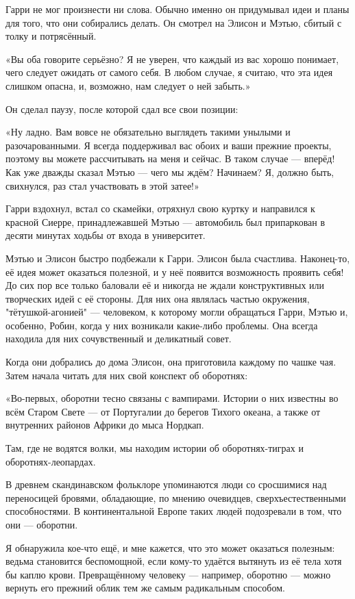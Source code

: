 \documentclass[a4paper,12pt]{book}
\begin{document}
Гарри не мог произнести ни слова. Обычно именно он придумывал идеи и планы для того, что они собирались делать. Он смотрел на Элисон и Мэтью, сбитый с толку и потрясённый.
\par
«Вы оба говорите серьёзно? Я не уверен, что каждый из вас хорошо понимает, чего следует ожидать от самого себя. В любом случае, я считаю, что эта идея слишком опасна, и, возможно, нам следует о ней забыть.»
\par
Он сделал паузу, после которой сдал все свои позиции:
\par
«Ну ладно. Вам вовсе не обязательно выглядеть такими унылыми и разочарованными. Я всегда поддерживал вас обоих и ваши прежние проекты, поэтому вы можете рассчитывать на меня и сейчас. В таком случае — вперёд! Как уже дважды сказал Мэтью — чего мы ждём? Начинаем? Я, должно быть, свихнулся, раз стал участвовать в этой затее!»
\par
Гарри вздохнул, встал со скамейки, отряхнул свою куртку и направился к красной Сиерре, принадлежавшей Мэтью — автомобиль был припаркован в десяти минутах ходьбы от входа в университет.
\par
Мэтью и Элисон быстро подбежали к Гарри. Элисон была счастлива. Наконец-то, её идея может оказаться полезной, и у неё появится возможность проявить себя! До сих пор все только баловали её и никогда не ждали конструктивных или творческих идей с её стороны. Для них она являлась частью окружения, "тётушкой-агонией" — человеком, к которому могли обращаться Гарри, Мэтью и, особенно, Робин, когда у них возникали какие-либо проблемы. Она всегда находила для них сочувственный и деликатный совет.
\par
Когда они добрались до дома Элисон, она приготовила каждому по чашке чая. Затем начала читать для них свой конспект об оборотнях:
\par
«Во-первых, оборотни тесно связаны с вампирами. Истории о них известны во всём Старом Свете — от Португалии до берегов Тихого океана, а также от внутренних районов Африки до мыса Нордкап.
\par
Там, где не водятся волки, мы находим истории об оборотнях-тиграх и оборотнях-леопардах.
\par
В древнем скандинавском фольклоре упоминаются люди со сросшимися над переносицей бровями, обладающие, по мнению очевидцев, сверхъестественными способностями. В континентальной Европе таких людей подозревали в том, что они — оборотни.
\par
Я обнаружила кое-что ещё,  и мне кажется, что это может оказаться полезным: ведьма становится беспомощной, если кому-то удаётся вытянуть из её тела хотя бы каплю крови. Превращённому человеку — например, оборотню — можно вернуть его прежний облик тем же самым радикальным способом.
\end{document}
